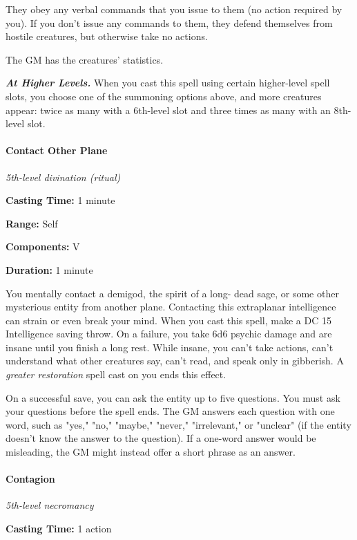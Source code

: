 \documentclass[
]{article}
\begin{document}
They obey any verbal commands that you issue to them (no action required
by you). If you don't issue any commands to them, they defend themselves
from hostile creatures, but otherwise take no actions.

The GM has the creatures' statistics.

\emph{\textbf{At Higher Levels.}} When you cast this spell using certain
higher-level spell slots, you choose one of the summoning options above,
and more creatures appear: twice as many with a 6th-level slot and three
times as many with an 8th-level slot.

\hypertarget{contact-other-plane}{%
\paragraph{Contact Other Plane}\label{contact-other-plane}}

\emph{5th-level divination (ritual)}

\textbf{Casting Time:} 1 minute

\textbf{Range:} Self

\textbf{Components:} V

\textbf{Duration:} 1 minute

You mentally contact a demigod, the spirit of a long- dead sage, or some
other mysterious entity from another plane. Contacting this extraplanar
intelligence can strain or even break your mind. When you cast this
spell, make a DC 15 Intelligence saving throw. On a failure, you take
6d6 psychic damage and are insane until you finish a long rest. While
insane, you can't take actions, can't understand what other creatures
say, can't read, and speak only in gibberish. A \emph{greater
restoration} spell cast on you ends this effect.

On a successful save, you can ask the entity up to five questions. You
must ask your questions before the spell ends. The GM answers each
question with one word, such as "yes," "no," "maybe," "never,"
"irrelevant," or "unclear" (if the entity doesn't know the answer to the
question). If a one-word answer would be misleading, the GM might
instead offer a short phrase as an answer.

\hypertarget{contagion}{%
\paragraph{Contagion}\label{contagion}}

\emph{5th-level necromancy}

\textbf{Casting Time:} 1 action
\end{document}
